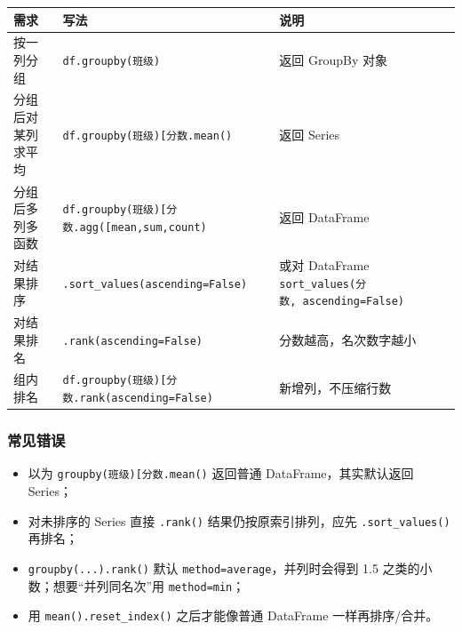{\def\LTcaptype{none} %
\begin{longtable}[]{@{}
  >{\raggedright\arraybackslash}p{}
  >{\raggedright\arraybackslash}p{}
  >{\raggedright\arraybackslash}p{}@{}}
\toprule\noalign{}
\begin{minipage}[b]{\linewidth}\raggedright
需求
\end{minipage} & \begin{minipage}[b]{\linewidth}\raggedright
写法
\end{minipage} & \begin{minipage}[b]{\linewidth}\raggedright
说明
\end{minipage} \\
\midrule\noalign{}
\endhead
\bottomrule\noalign{}
\endlastfoot
按一列分组 &
\texttt{df.groupby(\textquotesingle{}班级\textquotesingle{})} & 返回
GroupBy 对象 \\
分组后对某列求平均 &
\texttt{df.groupby(\textquotesingle{}班级\textquotesingle{}){[}\textquotesingle{}分数\textquotesingle{}{]}.mean()}
& 返回 Series \\
分组后多列多函数 &
\texttt{df.groupby(\textquotesingle{}班级\textquotesingle{}){[}\textquotesingle{}分数\textquotesingle{}{]}.agg({[}\textquotesingle{}mean\textquotesingle{},\textquotesingle{}sum\textquotesingle{},\textquotesingle{}count\textquotesingle{}{]})}
& 返回 DataFrame \\
对结果排序 & \texttt{.sort\_values(ascending=False)} & 或对 DataFrame
\texttt{sort\_values(\textquotesingle{}分数\textquotesingle{},\ ascending=False)} \\
对结果排名 & \texttt{.rank(ascending=False)} & 分数越高，名次数字越小 \\
组内排名 &
\texttt{df.groupby(\textquotesingle{}班级\textquotesingle{}){[}\textquotesingle{}分数\textquotesingle{}{]}.rank(ascending=False)}
& 新增列，不压缩行数 \\
\end{longtable}
}

\subsubsection{常见错误}\label{ux5e38ux89c1ux9519ux8bef-18}

\begin{itemize}
\tightlist
\item
  以为
  \texttt{groupby(\textquotesingle{}班级\textquotesingle{}){[}\textquotesingle{}分数\textquotesingle{}{]}.mean()}
  返回普通 DataFrame，其实默认返回 Series；
\item
  对未排序的 Series 直接 \texttt{.rank()} 结果仍按原索引排列，应先
  \texttt{.sort\_values()} 再排名；
\item
  \texttt{groupby(...).rank()} 默认
  \texttt{method=\textquotesingle{}average\textquotesingle{}}，并列时会得到
  1.5 之类的小数；想要``并列同名次''用
  \texttt{method=\textquotesingle{}min\textquotesingle{}}；
\item
  用 \texttt{mean().reset\_index()} 之后才能像普通 DataFrame
  一样再排序/合并。
\end{itemize}

